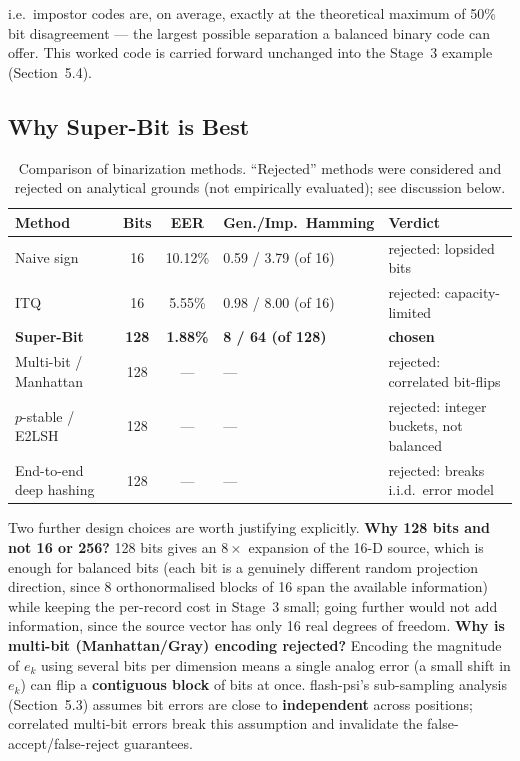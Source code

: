 \documentclass[11pt]{article}
\begin{document}
i.e.\ impostor codes are, on average, exactly at the theoretical maximum of 50\% bit
disagreement --- the largest possible separation a balanced binary code can offer. This
worked code is carried forward unchanged into the Stage~3 example (Section~5.4).

\subsection{Why Super-Bit is Best}

\begin{table}[h]
\centering
\small
\begin{tabular}{lccp{2.1cm}p{3.1cm}}
\toprule
Method & Bits & EER & Gen./Imp.\ Hamming & Verdict \\
\midrule
Naive sign            & 16  & 10.12\% & 0.59 / 3.79 (of 16)  & rejected: lopsided bits \\
ITQ                    & 16  & 5.55\%  & 0.98 / 8.00 (of 16)  & rejected: capacity-limited \\
\textbf{Super-Bit}     & \textbf{128} & \textbf{1.88\%} & \textbf{8 / 64 (of 128)} & \textbf{chosen} \\
Multi-bit / Manhattan  & 128 & ---     & ---                   & rejected: correlated bit-flips \\
$p$-stable / E2LSH     & 128 & ---     & ---                   & rejected: integer buckets, not balanced \\
End-to-end deep hashing & 128 & ---    & ---                   & rejected: breaks i.i.d.\ error model \\
\bottomrule
\end{tabular}
\caption{Comparison of binarization methods. ``Rejected'' methods were considered and
rejected on analytical grounds (not empirically evaluated); see discussion below.}
\label{tab:binarize-compare}
\end{table}

Two further design choices are worth justifying explicitly. \textbf{Why 128 bits and not
16 or 256?} 128 bits gives an $8\times$ expansion of the 16-D source, which is enough for
balanced bits (each bit is a genuinely different random projection direction, since 8
orthonormalised blocks of 16 span the available information) while keeping the per-record
cost in Stage~3 small; going further would not add information, since the source vector has
only 16 real degrees of freedom. \textbf{Why is multi-bit (Manhattan/Gray) encoding
rejected?} Encoding the magnitude of $e_k$ using several bits per dimension means a single
analog error (a small shift in $e_k$) can flip a \textbf{contiguous block} of bits at once.
flash-psi's sub-sampling analysis (Section~5.3) assumes bit errors are close to
\textbf{independent} across positions; correlated multi-bit errors break this assumption
and invalidate the false-accept/false-reject guarantees.
\end{document}
